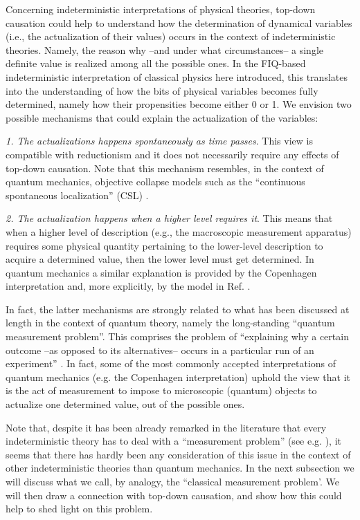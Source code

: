 \documentclass[aps,prl,twocolumn,showpacs,superscriptaddress,groupedaddress, nofootinbib]{revtex4-1}
\begin{document}
Concerning indeterministic interpretations of physical theories, top-down causation could help to understand how the determination of dynamical variables (i.e., the actualization of their values) occurs in the context of indeterministic theories. Namely, the reason why --and under what circumstances-- a single definite value is realized among all the possible ones. In the FIQ-based indeterministic interpretation of classical physics here introduced, this translates into the understanding of how the bits of physical variables becomes fully determined, namely how their propensities become either 0 or 1. We envision two possible mechanisms that could explain the actualization of the variables:

\textit{1. The actualizations happens spontaneously as time passes}. This view is compatible with reductionism and it does not necessarily require any effects of top-down causation. Note that this mechanism resembles, in the context of quantum mechanics, objective collapse models such as the ``continuous spontaneous localization'' (CSL) \cite{gisincollapse, cls}. 

\textit{2. The actualization happens when a higher level requires it}. This means that when a higher level of description (e.g., the macroscopic measurement apparatus) requires some physical quantity pertaining to the lower-level description to acquire a determined value, then the lower level must get determined. In quantum mechanics a similar explanation is provided by the Copenhagen interpretation and, more explicitly, by the model in Ref. \cite{topdown2}.

In fact, the latter mechanisms are strongly related to what has been discussed at length in the context of quantum theory, namely the long-standing ``quantum measurement problem''. This comprises the problem of ``explaining why a certain outcome --as opposed to its alternatives-- occurs in a particular run of an experiment'' \cite{brukner}. In fact, some of the most commonly accepted interpretations of quantum mechanics (e.g. the Copenhagen interpretation) uphold the view that it is the act of measurement to impose to microscopic (quantum) objects to actualize one determined value, out of the possible ones.

Note that, despite it has been already remarked in the literature that every indeterministic theory has to deal with a ``measurement problem'' (see e.g. \cite{brukner}), it seems that there has hardly been any consideration of this issue in the context of other indeterministic theories than quantum mechanics. In the next subsection we will discuss what we call, by analogy, the ``classical measurement problem'. We will then draw a connection with top-down causation, and show how this could help to shed light on this problem.
\end{document}
